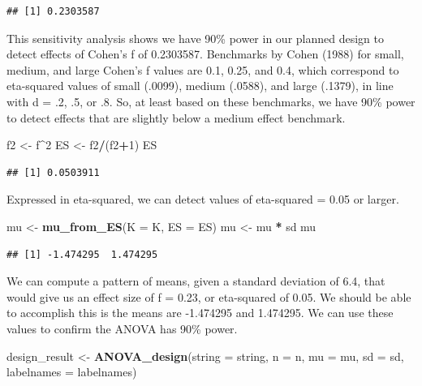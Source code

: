 \documentclass[]{article}
\newenvironment{Shaded}{\begin{snugshade}}{\end{snugshade}}
\newcommand{\KeywordTok}[1]{\textcolor[rgb]{0.13,0.29,0.53}{\textbf{#1}}}
\newcommand{\DataTypeTok}[1]{\textcolor[rgb]{0.13,0.29,0.53}{#1}}
\newcommand{\DecValTok}[1]{\textcolor[rgb]{0.00,0.00,0.81}{#1}}
\newcommand{\StringTok}[1]{\textcolor[rgb]{0.31,0.60,0.02}{#1}}
\newcommand{\OperatorTok}[1]{\textcolor[rgb]{0.81,0.36,0.00}{\textbf{#1}}}
\newcommand{\NormalTok}[1]{#1}
\begin{document}
\begin{verbatim}
## [1] 0.2303587
\end{verbatim}

This sensitivity analysis shows we have 90\% power in our planned design
to detect effects of Cohen's f of 0.2303587. Benchmarks by Cohen (1988)
for small, medium, and large Cohen's f values are 0.1, 0.25, and 0.4,
which correspond to eta-squared values of small (.0099), medium (.0588),
and large (.1379), in line with d = .2, .5, or .8. So, at least based on
these benchmarks, we have 90\% power to detect effects that are slightly
below a medium effect benchmark.

\begin{Shaded}
\begin{Highlighting}[]
\NormalTok{f2 <-}\StringTok{ }\NormalTok{f}\OperatorTok{^}\DecValTok{2}
\NormalTok{ES <-}\StringTok{ }\NormalTok{f2}\OperatorTok{/}\NormalTok{(f2}\OperatorTok{+}\DecValTok{1}\NormalTok{)}
\NormalTok{ES}
\end{Highlighting}
\end{Shaded}

\begin{verbatim}
## [1] 0.0503911
\end{verbatim}

Expressed in eta-squared, we can detect values of eta-squared = 0.05 or
larger.

\begin{Shaded}
\begin{Highlighting}[]
\NormalTok{mu <-}\StringTok{ }\KeywordTok{mu_from_ES}\NormalTok{(}\DataTypeTok{K =}\NormalTok{ K, }\DataTypeTok{ES =}\NormalTok{ ES)}
\NormalTok{mu <-}\StringTok{ }\NormalTok{mu }\OperatorTok{*}\StringTok{ }\NormalTok{sd}
\NormalTok{mu}
\end{Highlighting}
\end{Shaded}

\begin{verbatim}
## [1] -1.474295  1.474295
\end{verbatim}

We can compute a pattern of means, given a standard deviation of 6.4,
that would give us an effect size of f = 0.23, or eta-squared of 0.05.
We should be able to accomplish this is the means are -1.474295 and
1.474295. We can use these values to confirm the ANOVA has 90\% power.

\begin{Shaded}
\begin{Highlighting}[]
\NormalTok{design_result <-}\StringTok{ }\KeywordTok{ANOVA_design}\NormalTok{(}\DataTypeTok{string =}\NormalTok{ string,}
                   \DataTypeTok{n =}\NormalTok{ n, }
                   \DataTypeTok{mu =}\NormalTok{ mu, }
                   \DataTypeTok{sd =}\NormalTok{ sd, }
                   \DataTypeTok{labelnames =}\NormalTok{ labelnames)}
\end{Highlighting}
\end{Shaded}
\end{document}
